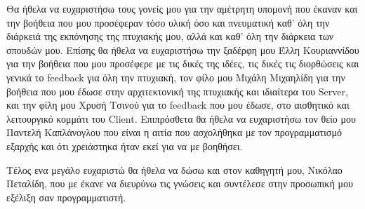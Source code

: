 \begin{Acknowledgement}
 Θα ήθελα να ευχαριστήσω τους γονείς μου για την αμέτρητη υπομονή που έκαναν και την βοήθεια που μου προσέφεραν τόσο υλική όσο και πνευματική καθ' όλη την διάρκειά της εκπόνησης της πτυχιακής μου, αλλά και καθ' όλη την διάρκεια των σπουδών μου. Επίσης θα ήθελα να ευχαριστήσω την ξαδέρφη μου Έλλη Κουριαννίδου για την βοήθεια που μου προσέφερε με τις δικές της ιδέες, τις δικές τις διορθώσεις και γενικά το feedback για όλη την πτυχιακή, τον φίλο μου Μιχάλη Μιχαηλίδη για την βοήθεια που μου έδωσε στην αρχιτεκτονική της πτυχιακής και ιδιαίτερα του Server, και την φίλη μου Χρυσή Τσινού για το feedback που μου έδωσε, στο αισθητικό και λειτουργικό κομμάτι του Client. Επιπρόσθετα θα ήθελα να ευχαριστήσω τον θείο μου Παντελή Καπλάνογλου που είναι η αιτία που ασχολήθηκα με τον προγραμματισμό εξαρχής και ότι χρειάστηκα ήταν εκεί για να με βοηθήσει. 
 
 Τέλος ενα μεγάλο ευχαριστώ θα ήθελα να δώσω και στον καθηγητή μου, Νικόλαο Πεταλίδη, που με έκανε να διευρύνω τις γνώσεις και συντέλεσε στην προσωπική μου εξέλιξη σαν προγραμματιστή.
\end{Acknowledgement}
